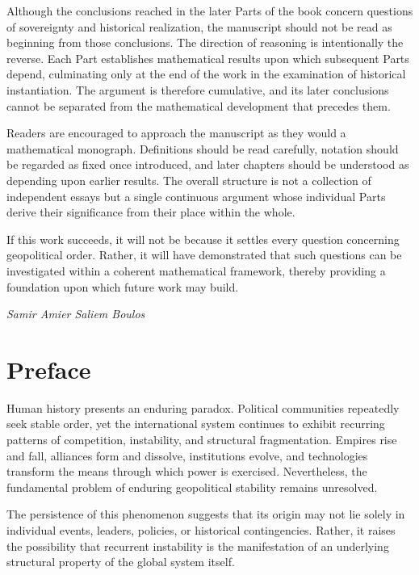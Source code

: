 \documentclass[11pt,openany]{book}
\theoremstyle{plain}
\theoremstyle{definition}
\begin{document}
Although the conclusions reached in the later Parts of the book concern questions of sovereignty and historical realization, the manuscript should not be read as beginning from those conclusions. The direction of reasoning is intentionally the reverse. Each Part establishes mathematical results upon which subsequent Parts depend, culminating only at the end of the work in the examination of historical instantiation. The argument is therefore cumulative, and its later conclusions cannot be separated from the mathematical development that precedes them.

Readers are encouraged to approach the manuscript as they would a mathematical monograph. Definitions should be read carefully, notation should be regarded as fixed once introduced, and later chapters should be understood as depending upon earlier results. The overall structure is not a collection of independent essays but a single continuous argument whose individual Parts derive their significance from their place within the whole.

If this work succeeds, it will not be because it settles every question concerning geopolitical order. Rather, it will have demonstrated that such questions can be investigated within a coherent mathematical framework, thereby providing a foundation upon which future work may build.

\vspace{1cm}

\begin{flushright}
\textit{Samir Amier Saliem Boulos}
\end{flushright}



\chapter*{Preface}

Human history presents an enduring paradox. Political communities repeatedly seek stable order, yet the international system continues to exhibit recurring patterns of competition, instability, and structural fragmentation. Empires rise and fall, alliances form and dissolve, institutions evolve, and technologies transform the means through which power is exercised. Nevertheless, the fundamental problem of enduring geopolitical stability remains unresolved.

The persistence of this phenomenon suggests that its origin may not lie solely in individual events, leaders, policies, or historical contingencies. Rather, it raises the possibility that recurrent instability is the manifestation of an underlying structural property of the global system itself.
\end{document}

